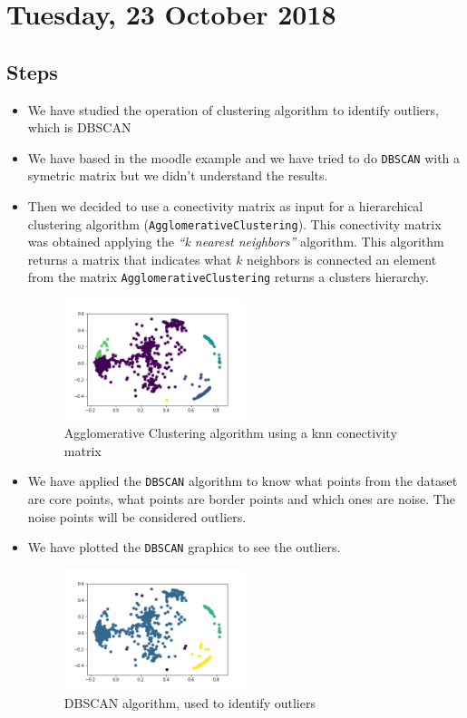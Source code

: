 \section{Tuesday, 23 October 2018}

\subsection{Steps}
\begin{itemize}
\item We have studied the operation of clustering algorithm to identify outliers, which is DBSCAN
\item We have based in the moodle example and we have tried to do \texttt{DBSCAN}  with a symetric matrix  but we didn't understand the results.
\item Then we decided to use a conectivity matrix as input for a hierarchical clustering algorithm (\texttt{AgglomerativeClustering}). This conectivity matrix was obtained applying the \textit{``k nearest neighbors''}  algorithm. This algorithm returns a matrix that indicates what $k$ neighbors is connected an element from the matrix \texttt{AgglomerativeClustering} returns a clusters hierarchy.

\begin{figure}[!htb]
\centering
\includegraphics[width=0.5\textwidth]{../../reports/figures/AgglomerativeClustering_AccelerometerStat.png}
\caption{Agglomerative Clustering algorithm using a knn conectivity matrix}
\label{fig:agglomerative}
\end{figure}

\item We have applied the \texttt{DBSCAN} algorithm to know what points from the dataset are core points, what points are border points and which ones are noise. The noise points will be considered outliers.

\item We have plotted the \texttt{DBSCAN} graphics to see the outliers.

\begin{figure}[!htb]
\centering
\includegraphics[width=0.5\textwidth]{../../reports/figures/DBSCAN_AccelerometerStat.png}
\caption{DBSCAN algorithm, used to identify outliers}
\label{fig:dbscan}
\end{figure}

\end{itemize}